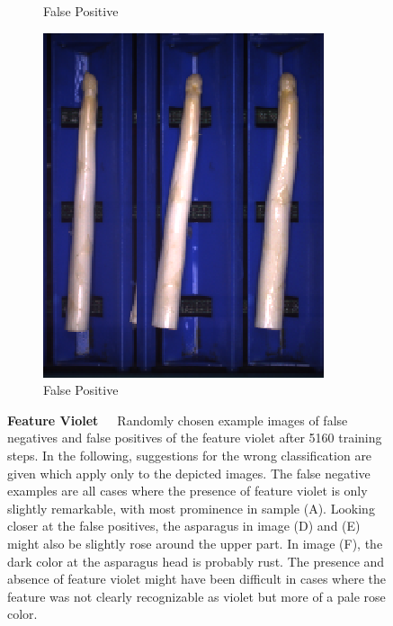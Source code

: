 \begin{figure}[!htb]
\begin{subfigure}{0.3\textwidth}
		\vspace{-5pt}
		\caption{False Positive}
	\end{subfigure}
	\begin{subfigure}{0.3\textwidth}
		\includegraphics[width=0.9\linewidth]{Figures/appendix/violet_falsepositive_03.png}
		\vspace{-5pt}
		\caption{False Positive}
	\end{subfigure}
	\vspace{-5pt}
    \caption[Single-Label CNN Example Images Feature Violet]{\textbf{Feature Violet}~~~Randomly chosen example images of false negatives and false positives of the feature violet after 5160 training steps. In the following, suggestions for the wrong classification are given which apply only to the depicted images. The false negative examples are all cases where the presence of feature violet is only slightly remarkable, with most prominence in sample (A). Looking closer at the false positives, the asparagus in image (D) and (E) might also be slightly rose around the upper part. In image (F), the dark color at the asparagus head is probably rust. The presence and absence of feature violet might have been difficult in cases where the feature was not clearly recognizable as violet but more of a pale rose color.}
    \label{fig:ExampleImagesViolet}
\end{figure}

